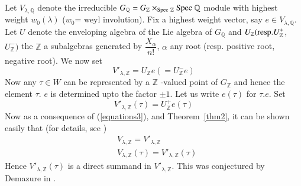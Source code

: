 \begin{rem}
Let $V_{\lambda, \mathbb{Q}}$ denote the irreducible $G_{\mathbb{Q}}=G_{\mathbb{Z}}\times_{\spec\ \mathbb{Z}} \spec\ \mathbb{Q}$ module with highest weight $w_{0}(\lambda)$ ($w_{0}$= weyl involution). Fix a highest weight vector, say $e\in V_{\lambda, \mathbb{Q}}$. Let $U$ denote the enveloping algebra of the Lie algebra of $G_{\mathbb{Q}}$ and $U_{\mathbb{Z}} (\mathrm{resp.} U^{+}_{\mathbb{Z}}$, $U^{-}_{\mathbb{Z}})$ the $\mathbb{Z}$ a subalgebras generated by $\dfrac{X_{\alpha}}{n!}$, $\alpha$ any root (resp. positive root, negative root). We now set 
\begin{equation*}\label{equations5}
V'_{\lambda, \mathbb{Z}}=U_{\mathbb{Z}}e(= U^{-}_{\mathbb{Z}} e)\tag{5}
\end{equation*}\pageoriginale
Now any $\tau\in W$ can be represented by a $\mathbb{Z}$ -valued point of $G_{\mathbb{Z}}$ and hence the element $\tau$. $e$ is determined upto the factor $\pm 1$. Let us write $e(\tau)$ for $\tau.e.$ Set 
\begin{equation*}\label{equations6}
V'_{\lambda, \mathbb{Z}}(\tau)=U^{+}_{\mathbb{Z}}e(\tau)\tag{6}
\end{equation*}
Now as a consequence of (\ref{equations3}), and Theorem~\ref{thm2}, it can be shown easily that (for details, see \cite{key6})
\begin{equation*}\label{equations7}
\begin{aligned}
&V_{\lambda, \mathbb{Z}}=V'_{\lambda, \mathbb{Z}}\\
& V_{\lambda, \mathbb{Z}}(\tau) = V'_{\lambda, \mathbb{Z}}(\tau)
\end{aligned}\tag{7}
\end{equation*}
Hence $V'_{\lambda, \mathbb{Z}}(\tau)$ is a direct summand in $V'_{\lambda, \mathbb{Z}}$. This was conjectured by Demazure in \cite{key1}. 
\end{rem}

